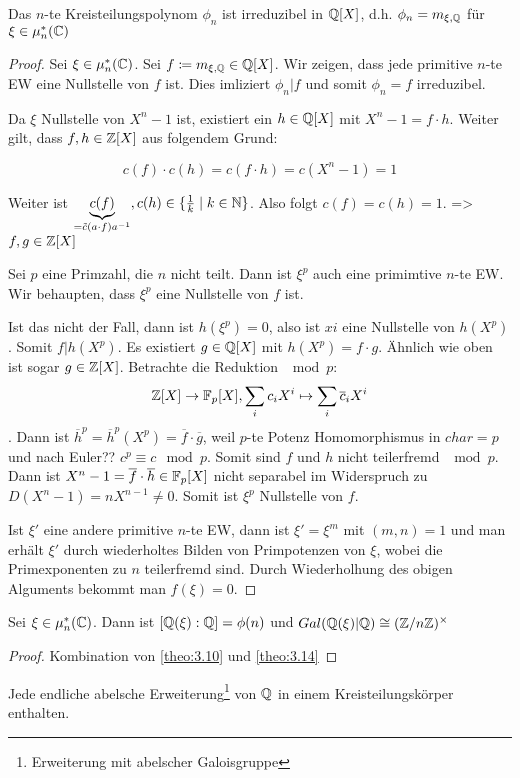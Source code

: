 \documentclass[../main.tex]{subfiles}
\begin{document}
\begin{theorem}\label{theo:3.14}
    Das $n$-te Kreisteilungspolynom $\phi_n$ ist irreduzibel in $\mathbb{Q}[X]$, d.h.
    $\phi_n=m_{\xi,\mathbb{Q}}$ für $\xi\in \mu_n^*(\mathbb{C})$
\end{theorem}
\begin{proof}
    Sei $\xi \in \mu_n^*(\mathbb{C})$. Sei $f\coloneqq m_{\xi,\mathbb{Q}} \in \mathbb{Q}[X]$.
    Wir zeigen, dass jede primitive $n$-te EW eine Nullstelle von $f$ ist.
    Dies imliziert $\phi_n |f$ und somit $\phi_n =f$ irreduzibel.
    
    Da $\xi$ Nullstelle von $X^n-1$ ist, existiert ein $h\in\mathbb{Q}[X]$ mit $X^n-1=f\cdot h$.
    Weiter gilt, dass $f,h\in \mathbb{Z}[X]$ aus folgendem Grund:
    \begin{reminder*}
        $$c(f)\cdot c(h) = c(f\cdot h) = c(X^n-1) = 1$$
        
    \end{reminder*}
    Weiter ist $\underbrace{c(f)}_{ =\Tilde{c}(a\cdot f) a^{-1}},c(h)\in \{\frac{1}{k}\mid k\in \mathbb{N}\}$.
    Also folgt $c(f) = c(h)=1$. => $f,g\in \mathbb{Z}[X]$

    Sei $p$ eine Primzahl, die $n$ nicht teilt.
    Dann ist $\xi^p$ auch eine primimtive $n$-te EW.
    Wir behaupten, dass $\xi^p$ eine Nullstelle von $f$ ist.

    Ist das nicht der Fall, dann ist $h(\xi^p)=0$, also ist $xi$ eine Nullstelle von $h(X^p)$.
    Somit $f|h(X^p)$. Es existiert $g\in \mathbb{Q}[X]$ mit $h(X^p) = f\cdot g$.
    Ähnlich wie oben ist sogar $g\in \mathbb{Z}[X]$.
    Betrachte die Reduktion $\mod p$:
    $$\mathbb{Z}[X] \rightarrow \mathbb{F}_p[X], \sum_i c_i X^i \mapsto \sum_i \overline{c}_i X^i$$.
    Dann ist $\overline{h}^p = \overline{h}^p(X^p)= \overline{f}\cdot \overline{g}$, weil $p$-te Potenz Homomorphismus in $char=p$ und nach Euler?? $c^p\equiv c \mod p$.
    Somit sind $f$ und $h$ nicht teilerfremd $\mod p$.
    Dann ist $X^n-1 = \overline{f}\cdot\overline{h}\in \mathbb{F}_p[X]$ nicht separabel im Widerspruch zu $D(X^n-1) = nX^{n-1} \neq 0$.
    Somit ist $\xi^p$ Nullstelle von $f$.

    Ist $\xi'$ eine andere primitive $n$-te EW, dann ist $\xi' = \xi^m$ mit $(m,n)=1$ und man erhält $\xi'$ durch wiederholtes Bilden von Primpotenzen von $\xi$, wobei die Primexponenten zu $n$ teilerfremd sind.
    Durch Wiederholhung des obigen Alguments bekommt man $f(\xi)=0$.
\end{proof}
\begin{corollary}
    Sei $\xi\in \mu_n^*(\mathbb{C})$.
     Dann ist $[\mathbb{Q}(\xi):\mathbb{Q}] = \phi(n)$ und $Gal(\mathbb{Q}(\xi)|\mathbb{Q})\cong (\mathbb{Z}/n\mathbb{Z})^\times$
\end{corollary}
\begin{proof}
    Kombination von \ref{theo:3.10} und \ref{theo:3.14}
\end{proof}
\begin{remark*}
      Jede endliche abelsche Erweiterung\footnote{Erweiterung mit abelscher Galoisgruppe} von $\mathbb{Q}$ in einem Kreisteilungskörper enthalten.
\end{remark*}
\end{document}
